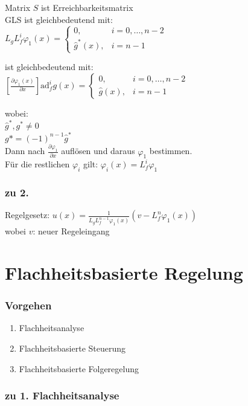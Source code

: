 \documentclass[german]{latex4ei/latex4ei_sheet}
\begin{document}
Matrix $S$ ist Erreichbarkeitsmatrix \\

GLS ist gleichbedeutend mit: \\
$ L_g L_f^i \varphi_1(x) =
\begin{cases}
  0, & i = 0, \dots, n-2 \\
  \hat{g}^*(x), & i = n-1
\end{cases}$

ist gleichbedeutend mit: \\
$\left[ \frac{\partial \varphi_1(x)}{\partial x} \right] \text{ad}_f^i g(x) =
\begin{cases}
  0, & i = 0, \dots, n-2 \\
  \hat{g}(x), & i = n-1
\end{cases}$

wobei:\\
$\hat{g}^*, g^* \neq 0$ \\
$g* = (-1)^{n-1} \hat{g}^*$\\

Dann nach $\frac{\partial \varphi_1}{\partial x}$ auflösen und daraus $\varphi_1$ bestimmen. \\
Für die restlichen $\varphi_i$ gilt: $\varphi_i(x) = L_f^i \varphi_1$

\subsubsection*{zu 2.}
Regelgesetz: $u(x) = \frac{1}{L_g L_f^{n-1} \varphi_1(x)} \left( v - L_f^n \varphi_1(x) \right)$\\
wobei $v$: neuer Regeleingang



\section{Flachheitsbasierte Regelung}

\subsubsection*{Vorgehen}
\begin{enumerate}
  \item Flachheitsanalyse
  \item Flachheitsbasierte Steuerung
  \item Flachheitsbasierte Folgeregelung
\end{enumerate}

\subsubsection*{zu 1. Flachheitsanalyse}
\end{document}
